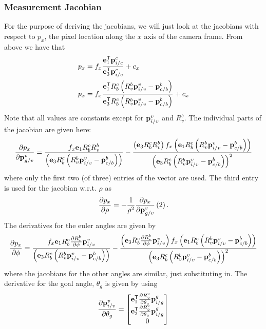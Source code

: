 \subsubsection{Measurement Jacobian}
For the purpose of deriving the jacobians, we will just look at the jacobians
with respect to $p_x$, the pixel location along the $x$ axis of the camera
frame. From above we have that
\begin{align}
  p_x &= f_x \frac{\boldsymbol{\mathrm{e}}_1^{\mathsf{T}} \boldsymbol{\mathrm{p}}_{i/c}^c}{\boldsymbol{\mathrm{e}}_3^{\mathsf{T}} \boldsymbol{\mathrm{p}}_{i/c}^c} + c_x \\ 
  p_x &= f_x \frac{\boldsymbol{\mathrm{e}}_1^{\mathsf{T}} R_b^c \left(R_v^b \boldsymbol{\mathrm{p}}_{i/v}^v -
      \boldsymbol{\mathrm{p}}_{c/b}^b\right) }{\boldsymbol{\mathrm{e}}_3^{\mathsf{T}} R_b^c \left(R_v^b \boldsymbol{\mathrm{p}}_{i/v}^v -
  \boldsymbol{\mathrm{p}}_{c/b}^b\right) } + c_x 
\end{align}
Note that all values are constants except for $\boldsymbol{\mathrm{p}}_{i/v}^v$ and $R_v^b$.
The individual parts of the jacobian are given here:
\begin{equation}
  \frac{\partial p_x}{\partial \boldsymbol{\mathrm{p}}_{g/v}^v} =
  \frac{f_x \boldsymbol{\mathrm{e}}_1 R_b^c R_v^b}
    {\left(\boldsymbol{\mathrm{e}}_3 R_b^c \left(R_v^b \boldsymbol{\mathrm{p}}_{i/v}^v -
    \boldsymbol{\mathrm{p}}_{c/b}^b\right)\right)}
    - \frac{\left(\boldsymbol{\mathrm{e}}_3 R_b^c R_v^b \right) f_x \left(\boldsymbol{\mathrm{e}}_1 R_b^c \left(R_v^b \boldsymbol{\mathrm{p}}_{i/v}^v -
        \boldsymbol{\mathrm{p}}_{c/b}^b\right)\right)} {\left(\boldsymbol{\mathrm{e}}_3 R_b^c \left(R_v^b \boldsymbol{\mathrm{p}}_{i/v}^v -
  \boldsymbol{\mathrm{p}}_{c/b}^b\right)\right)^2}
\end{equation}
where only the first two (of three) entries of the vector are used. The third
entry is used for the jacobian w.r.t. $\rho$ as
\begin{equation}
  \frac{\partial p_x}{\partial \rho} = -\frac{1}{\rho^2} \frac{\partial p_x}{\partial
  \boldsymbol{\mathrm{p}}_{g/v}^v}\left(2\right).
\end{equation}
The derivatives for the euler angles are given by
\begin{equation}
  \frac{\partial p_x}{\partial \phi} =
  \frac{f_x \boldsymbol{\mathrm{e}}_1 R_b^c \frac{\partial R_v^b}{\partial \phi} \boldsymbol{\mathrm{p}}_{i/v}^v}
    {\left(\boldsymbol{\mathrm{e}}_3 R_b^c \left(R_v^b \boldsymbol{\mathrm{p}}_{i/v}^v -
    \boldsymbol{\mathrm{p}}_{c/b}^b\right)\right)}
    - \frac{\left(\boldsymbol{\mathrm{e}}_3 R_b^c \frac{\partial R_v^b}{\partial \phi} \boldsymbol{\mathrm{p}}_{i/v}^v \right) f_x \left(\boldsymbol{\mathrm{e}}_1 R_b^c \left(R_v^b \boldsymbol{\mathrm{p}}_{i/v}^v -
        \boldsymbol{\mathrm{p}}_{c/b}^b\right)\right)} {\left(\boldsymbol{\mathrm{e}}_3 R_b^c \left(R_v^b \boldsymbol{\mathrm{p}}_{i/v}^v -
  \boldsymbol{\mathrm{p}}_{c/b}^b\right)\right)^2}
\end{equation}
where the jacobians for the other angles are similar, just substituting in.
The derivative for the goal angle, $\theta_g$ is given by using
\begin{equation}
  \frac{\partial \boldsymbol{\mathrm{p}}_{i/v}^v}{\partial \theta_g} =
  \begin{bmatrix}
    \boldsymbol{\mathrm{e}}_1^{\mathsf{T}} \frac{\partial R_g^v}{\partial \theta_g} \boldsymbol{\mathrm{p}}_{i/g}^g \\
    \boldsymbol{\mathrm{e}}_2^{\mathsf{T}} \frac{\partial R_g^v}{\partial \theta_g} \boldsymbol{\mathrm{p}}_{i/g}^g \\
    0
  \end{bmatrix}
\end{equation}

